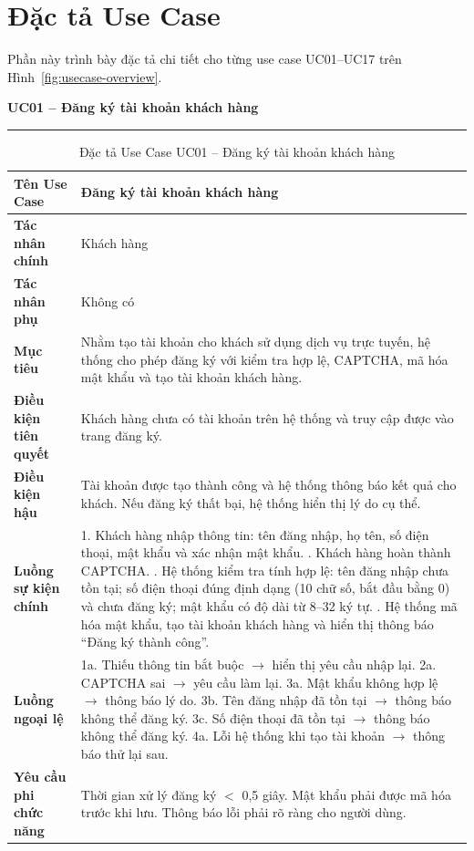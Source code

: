 ﻿\documentclass[../DoAn.tex]{subfiles}
\newcommand{\UCtitle}[1]{%
    \vspace{0.5em}
    {\large\bfseries #1}\\[-0.5em]
    \rule{\textwidth}{0.5pt}
    \vspace{0.3em}
}
\begin{document}
\section{Đặc tả Use Case}

Phần này trình bày đặc tả chi tiết cho từng use case UC01--UC17 trên Hình~\ref{fig:usecase-overview}.

\begin{table}[H]
\UCtitle{UC01 – Đăng ký tài khoản khách hàng}
\centering
\begin{tabular}{|p{4cm}|p{10cm}|}
\hline
\textbf{Tên Use Case} & Đăng ký tài khoản khách hàng \\ \hline
\textbf{Tác nhân chính} & Khách hàng \\ \hline
\textbf{Tác nhân phụ} & Không có \\ \hline
\textbf{Mục tiêu} &
Nhằm tạo tài khoản cho khách sử dụng dịch vụ trực tuyến, hệ thống cho phép đăng ký với kiểm tra hợp lệ, CAPTCHA, mã hóa mật khẩu và tạo tài khoản khách hàng.
\\ \hline
\textbf{Điều kiện tiên quyết} &
Khách hàng chưa có tài khoản trên hệ thống và truy cập được vào trang đăng ký.
\\ \hline
\textbf{Điều kiện hậu} &
Tài khoản được tạo thành công và hệ thống thông báo kết quả cho khách. Nếu đăng ký thất bại, hệ thống hiển thị lý do cụ thể.
\\ \hline
\textbf{Luồng sự kiện chính} &
1. Khách hàng nhập thông tin: tên đăng nhập, họ tên, số điện thoại, mật khẩu và xác nhận mật khẩu. \newline
2. Khách hàng hoàn thành CAPTCHA. \newline
3. Hệ thống kiểm tra tính hợp lệ: tên đăng nhập chưa tồn tại; số điện thoại đúng định dạng (10 chữ số, bắt đầu bằng 0) và chưa đăng ký; mật khẩu có độ dài từ 8--32 ký tự. \newline
4. Hệ thống mã hóa mật khẩu, tạo tài khoản khách hàng và hiển thị thông báo ``Đăng ký thành công''.
\\ \hline
\textbf{Luồng ngoại lệ} &
1a. Thiếu thông tin bắt buộc $\rightarrow$ hiển thị yêu cầu nhập lại. \newline
2a. CAPTCHA sai $\rightarrow$ yêu cầu làm lại. \newline
3a. Mật khẩu không hợp lệ $\rightarrow$ thông báo lý do. \newline
3b. Tên đăng nhập đã tồn tại $\rightarrow$ thông báo không thể đăng ký. \newline
3c. Số điện thoại đã tồn tại $\rightarrow$ thông báo không thể đăng ký. \newline
4a. Lỗi hệ thống khi tạo tài khoản $\rightarrow$ thông báo thử lại sau.
\\ \hline
\textbf{Yêu cầu phi chức năng} &
Thời gian xử lý đăng ký $<$ 0,5 giây. Mật khẩu phải được mã hóa trước khi lưu. Thông báo lỗi phải rõ ràng cho người dùng.
\\ \hline
\end{tabular}
\caption{Đặc tả Use Case UC01 – Đăng ký tài khoản khách hàng}
\end{table}
\end{document}
